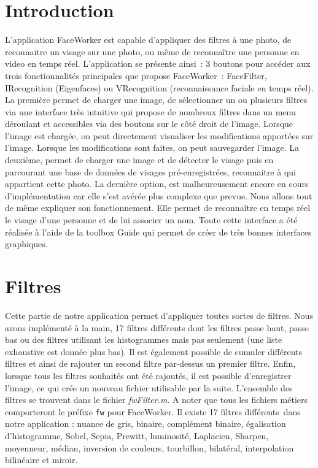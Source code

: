 \documentclass[12pt,a4paper]{article}
\begin{document}
\section{Introduction} 
L'application FaceWorker est capable d’appliquer des filtres à une photo, de reconnaitre un visage sur une photo, ou même de reconnaître une personne en video en temps réel.
\newline
L’application se présente ainsi : 3 boutons pour accéder aux trois fonctionnalités principales que propose FaceWorker : FaceFilter, IRecognition (Eigenfaces) ou VRecognition (reconnaissance faciale en temps réel). 
\newline
La première permet de charger une image, de sélectionner un ou plusieurs filtres via une interface très intuitive qui propose de nombreux filtres dans un menu déroulant et accessibles via des boutons sur le côté droit de l’image. Lorsque l’image est chargée, on peut directement visualiser les modifications apportées sur l’image. Lorsque les modifications sont faites, on peut sauvegarder l’image.
\newline
La deuxième, permet de charger une image et de détecter le visage puis en parcourant une base de données de visages pré-enregistrées, reconnaitre à qui appartient cette photo. 
 \newline
 La dernière option, est malheureusement encore en cours d’implémentation car elle s’est avérée plus complexe que prevue. Nous allons tout de même expliquer son fonctionnement. Elle permet de reconnaître en temps réel le visage d’une personne et de lui associer un nom.
 \newline
 Toute cette interface a été réalisée à l’aide de la toolbox Guide qui permet de créer de très bonnes interfaces graphiques.
 
\section{Filtres}
Cette partie de notre application permet d’appliquer toutes sortes de filtres. Nous avons implémenté à la main, 17 filtres différents dont les filtres passe haut, passe bas ou des filtres utilisant les histogrammes mais pas seulement (une liste exhaustive est donnée plus bas). Il est également possible de cumuler différents filtres et ainsi de rajouter un second filtre par-dessus un premier filtre. Enfin, lorsque tous les filtres souhaités ont été rajoutés, il est possible d’enregistrer l’image, ce qui crée un nouveau fichier utilisable par la suite. 
\newline
L'ensemble des filtres se trouvent dans le fichier \textit{fwFilter.m}. A noter que tous les fichiers métiers comporteront le préfixe \texttt{fw} pour FaceWorker.
\newline
Il existe 17 filtres différents dans notre application : nuance de gris, binaire, complément binaire, égalisation d’histogramme, Sobel, Sepia, Prewitt, luminosité, Laplacien, Sharpen, moyenneur, médian, inversion de couleurs, tourbillon, bilatéral, interpolation bilinéaire et miroir.
\end{document}
